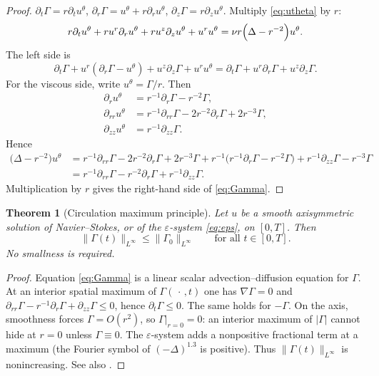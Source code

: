 \documentclass[11pt]{article}
\newtheorem{theorem}{Theorem}[section]
\theoremstyle{definition}
\newcommand{\eps}{\varepsilon}
\newcommand{\ur}{u^{r}}
\newcommand{\uz}{u^{z}}
\newcommand{\ut}{u^{\theta}}
\newcommand{\Ga}{\Gamma}
\newcommand{\Lint}{L^{\infty}}
\newcommand{\norm}[2]{\|#1\|_{#2}}
\newcommand{\abs}[1]{\lvert#1\rvert}
\begin{document}
\begin{proof}
\(\partial_t\Ga=r\partial_t\ut\),
\(\partial_r\Ga=\ut+r\partial_r\ut\),
\(\partial_z\Ga=r\partial_z\ut\).
Multiply \eqref{eq:utheta} by \(r\):
\[
  r\partial_t\ut+r\ur\partial_r\ut+r\uz\partial_z\ut+\ur\ut
  =\nu r\Bigl(\Delta-r^{-2}\Bigr)\ut.
\]
The left side is
\[
  \partial_t\Ga+\ur(\partial_r\Ga-\ut)+\uz\partial_z\Ga+\ur\ut
  =\partial_t\Ga+\ur\partial_r\Ga+\uz\partial_z\Ga.
\]
For the viscous side, write \(\ut=\Ga/r\). Then
\begin{align*}
\partial_r\ut&=r^{-1}\partial_r\Ga-r^{-2}\Ga,\\
\partial_{rr}\ut&=r^{-1}\partial_{rr}\Ga-2r^{-2}\partial_r\Ga+2r^{-3}\Ga,\\
\partial_{zz}\ut&=r^{-1}\partial_{zz}\Ga.
\end{align*}
Hence
\begin{align*}
\bigl(\Delta-r^{-2}\bigr)\ut
&=r^{-1}\partial_{rr}\Ga-2r^{-2}\partial_r\Ga+2r^{-3}\Ga
 +r^{-1}\bigl(r^{-1}\partial_r\Ga-r^{-2}\Ga\bigr)
 +r^{-1}\partial_{zz}\Ga-r^{-3}\Ga\\
&=r^{-1}\partial_{rr}\Ga-r^{-2}\partial_r\Ga+r^{-1}\partial_{zz}\Ga.
\end{align*}
Multiplication by \(r\) gives the right-hand side of \eqref{eq:Gamma}.
\end{proof}

\begin{theorem}[Circulation maximum principle]
\label{thm:gamma}
Let \(u\) be a smooth axisymmetric solution of Navier--Stokes, or of
the \(\eps\)-system \eqref{eq:eps}, on \([0,T]\). Then
\[
  \norm{\Ga(t)}{\Lint}\le\norm{\Ga_0}{\Lint}
  \qquad\text{for all }t\in[0,T].
\]
No smallness is required.
\end{theorem}

\begin{proof}
Equation \eqref{eq:Gamma} is a linear scalar advection--diffusion equation
for \(\Ga\). At an interior spatial maximum of \(\Ga(\,\cdot\,,t)\) one
has \(\nabla\Ga=0\) and
\(\partial_{rr}\Ga-r^{-1}\partial_r\Ga+\partial_{zz}\Ga\le 0\),
hence \(\partial_t\Ga\le 0\). The same holds for \(-\Ga\).
On the axis, smoothness forces \(\Ga=O(r^2)\), so \(\Ga|_{r=0}=0\):
an interior maximum of \(\abs{\Ga}\) cannot hide at \(r=0\) unless
\(\Ga\equiv 0\).
The \(\eps\)-system adds a nonpositive fractional term at a maximum
(the Fourier symbol of \((-\Delta)^{1.3}\) is positive).
Thus \(\norm{\Ga(t)}{\Lint}\) is nonincreasing.
See also \cite{Lady1968,CSTY2008}.
\end{proof}
\end{document}
